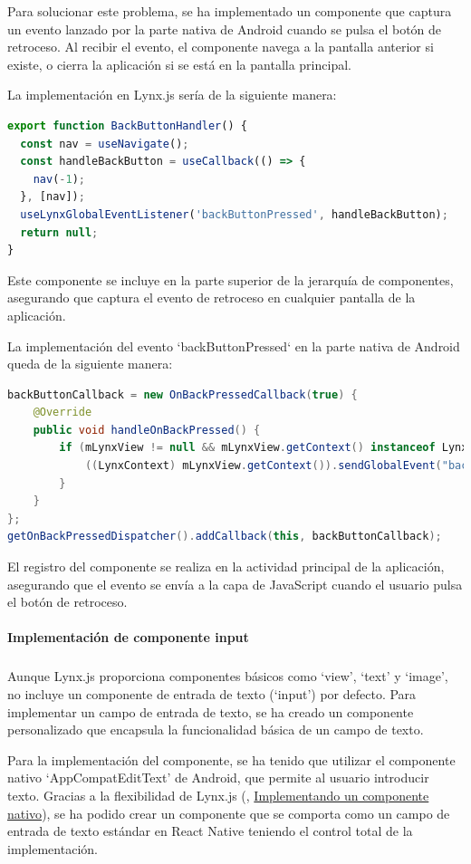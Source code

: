 Para solucionar este problema, se ha implementado un componente que captura un evento lanzado por la parte nativa de Android cuando se pulsa el botón de retroceso.
Al recibir el evento, el componente navega a la pantalla anterior si existe, o cierra la aplicación si se está en la pantalla principal.

La implementación en Lynx.js sería de la siguiente manera:
\begin{lstlisting}[language=typescript, caption={Implementación del botón de retroceso en Lynx.js}]
export function BackButtonHandler() {
  const nav = useNavigate();
  const handleBackButton = useCallback(() => {
    nav(-1);
  }, [nav]);
  useLynxGlobalEventListener('backButtonPressed', handleBackButton);
  return null;
}
\end{lstlisting}
Este componente se incluye en la parte superior de la jerarquía de componentes, asegurando que captura el evento de retroceso en cualquier pantalla de la aplicación.

La implementación del evento `backButtonPressed` en la parte nativa de Android queda de la siguiente manera:
\begin{lstlisting}[language=Java, caption={Implementación del evento de botón de retroceso en Android}]
backButtonCallback = new OnBackPressedCallback(true) {
    @Override
    public void handleOnBackPressed() {
        if (mLynxView != null && mLynxView.getContext() instanceof LynxContext) {
            ((LynxContext) mLynxView.getContext()).sendGlobalEvent("backButtonPressed", null);
        }
    }
};
getOnBackPressedDispatcher().addCallback(this, backButtonCallback);
\end{lstlisting}
El registro del componente se realiza en la actividad principal de la aplicación, asegurando que el evento se envía a la capa de JavaScript cuando el usuario pulsa el botón de retroceso.

\paragraph{Implementación de componente input}
\subparagraph{}

Aunque Lynx.js proporciona componentes básicos como `view', `text' y `image', no incluye un componente de entrada de texto (`input') por defecto.
Para implementar un campo de entrada de texto, se ha creado un componente personalizado que encapsula la funcionalidad básica de un campo de texto.

Para la implementación del componente, se ha tenido que utilizar el componente nativo `AppCompatEditText' de Android, que permite al usuario introducir texto.
Gracias a la flexibilidad de Lynx.js (\cite{lynx-documentation}, \href{https://lynxjs.org/guide/custom-native-component.html#platform=android}{Implementando un componente nativo}), se ha podido crear un componente que se comporta como un campo de entrada de texto estándar en React Native teniendo el control total de la implementación.
